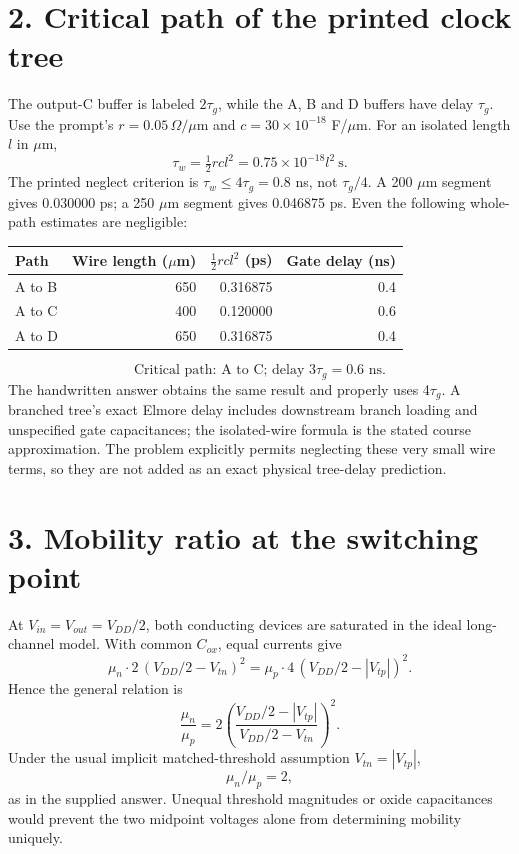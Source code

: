 \documentclass[11pt,a4paper]{article}
\begin{document}
\section*{2. Critical path of the printed clock tree}
The output-C buffer is labeled $2\tau_g$, while the A, B and D buffers have
delay $\tau_g$. Use the prompt's $r=0.05\,\Omega/\mu$m and
$c=30\times10^{-18}$ F/$\mu$m. For an isolated length $l$ in $\mu$m,
\[
 \tau_w=\tfrac12rcl^2=0.75\times10^{-18}l^2\ \mathrm{s}.
\]
The printed neglect criterion is $\tau_w\le4\tau_g=0.8$ ns, not
$\tau_g/4$. A 200 $\mu$m segment gives 0.030000 ps; a 250 $\mu$m segment
gives 0.046875 ps. Even the following whole-path estimates are negligible:
\begin{center}\begin{tabular}{lrrr}\toprule
Path&Wire length ($\mu$m)&$\tfrac12rcl^2$ (ps)&Gate delay (ns)\\\midrule
A to B&650&0.316875&0.4\\A to C&400&0.120000&0.6\\A to D&650&0.316875&0.4\\\bottomrule
\end{tabular}\end{center}
\[\boxed{\text{Critical path: A to C; delay }3\tau_g=0.6\text{ ns}.}\]
The handwritten answer obtains the same result and properly uses 4$\tau_g$.
A branched tree's exact Elmore delay includes downstream branch loading and
unspecified gate capacitances; the isolated-wire formula is the stated course
approximation. The problem explicitly permits neglecting these very small
wire terms, so they are not added as an exact physical tree-delay prediction.

\newpage\section*{3. Mobility ratio at the switching point}
At $V_{in}=V_{out}=V_{DD}/2$, both conducting devices are saturated in the
ideal long-channel model. With common $C_{ox}$, equal currents give
\[
 \mu_n\cdot2\,(V_{DD}/2-V_{tn})^2
 =\mu_p\cdot4\,(V_{DD}/2-|V_{tp}|)^2.
\]
Hence the general relation is
\[
 \boxed{\frac{\mu_n}{\mu_p}
 =2\left(\frac{V_{DD}/2-|V_{tp}|}{V_{DD}/2-V_{tn}}\right)^2.}
\]
Under the usual implicit matched-threshold assumption $V_{tn}=|V_{tp}|$,
\[\boxed{\mu_n/\mu_p=2,}\]
as in the supplied answer. Unequal threshold magnitudes or oxide capacitances
would prevent the two midpoint voltages alone from determining mobility uniquely.
\end{document}
